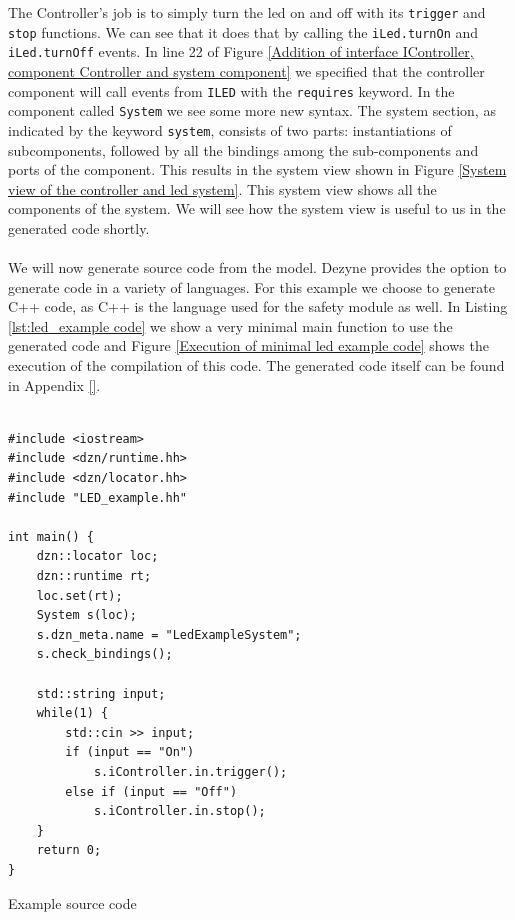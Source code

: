 \documentclass[12pt]{scrreprt}
\begin{document}
The Controller's job is to simply turn the led on and off with its \texttt{trigger} and \texttt{stop} functions. We can see that it does that by calling the \texttt{iLed.turnOn} and \texttt{iLed.turnOff} events. In line 22 of Figure \ref{Addition of interface IController, component Controller and system component} we specified that the controller component will call events from \texttt{ILED} with the \texttt{requires} keyword. In the component called \texttt{System} we see some more new syntax.  The system section, as indicated by the keyword \texttt{system}, consists of two parts: instantiations of subcomponents, followed by all the bindings among the sub-components and ports of the component. This results in the system view shown in  Figure \ref{System view of the controller and led system}. This system view shows all the components of the system. We will see how the system view is useful to us in the generated code shortly.
\\\\
We will now generate source code from the model. Dezyne provides the option to generate code in a variety of languages. For this example we choose to generate C++ code, as C++ is the language used for the safety module as well. In Listing \ref{lst:led_example code} we show a very minimal main function to use the generated code and Figure \ref{Execution of minimal led example code} shows the execution of the compilation of this code. The generated code itself can be found in Appendix \ref{}.

\begin{listing}[ht]
\begin{verbatim}
               
#include <iostream>
#include <dzn/runtime.hh>
#include <dzn/locator.hh>
#include "LED_example.hh"

int main() {
    dzn::locator loc;
    dzn::runtime rt;
    loc.set(rt);
    System s(loc);
    s.dzn_meta.name = "LedExampleSystem";
    s.check_bindings();

    std::string input;
    while(1) {
        std::cin >> input;
        if (input == "On")
            s.iController.in.trigger();
        else if (input == "Off")
            s.iController.in.stop();
    }
    return 0;
}

\end{verbatim}
\caption{Example source code}
\label{lst:led_example code}
\end{listing}
\end{document}
